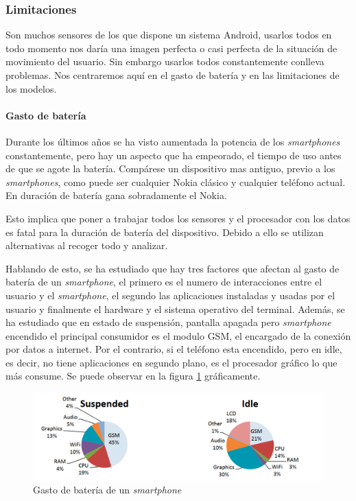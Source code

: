 \documentclass[12pt]{article}
\numberwithin{equation}{section}
\begin{document}
{\subsubsection{Limitaciones}

Son muchos sensores de los que dispone un sistema Android, usarlos todos en todo momento nos daría una imagen perfecta o casi perfecta de la situación de movimiento del usuario. Sin embargo usarlos todos constantemente conlleva problemas. Nos centraremos aquí en el gasto de batería y en las limitaciones de los modelos.

\paragraph{Gasto de batería}
Durante los últimos años se ha visto aumentada la potencia de los \textit{smartphones} constantemente, pero hay un aspecto que ha empeorado, el tiempo de uso antes de que se agote la batería. Compárese un dispositivo mas antiguo, previo a los \textit{smartphones}, como puede ser cualquier Nokia clásico y cualquier teléfono actual. En duración de batería gana sobradamente el Nokia. 

Esto implica que poner a trabajar todos los sensores y el procesador con los datos es fatal para la duración de batería del dispositivo. Debido a ello se utilizan alternativas al recoger todo y analizar. 

Hablando de esto, se ha estudiado que hay tres factores que afectan al gasto de batería de un \textit{smartphone}, el primero es el numero de interacciones entre el usuario y el \textit{smartphone}, el segundo las aplicaciones instaladas y usadas por el usuario y finalmente el hardware y el sistema operativo del terminal\cite{Falaki:2010:DSU:1814433.1814453}. Además, se ha estudiado que en estado de suspensión, pantalla apagada pero \textit{smartphone} encendido el principal consumidor es el modulo GSM, el encargado de la conexión por datos a internet. Por el contrario, si el teléfono esta encendido, pero en idle, es decir, no tiene aplicaciones en segundo plano, es el procesador gráfico lo que más consume\cite{Carroll:2010:APC:1855840.1855861}. Se puede observar en la figura \ref{fig:consumo} gráficamente.
\begin{figure}[h]
    \centering
    \includegraphics[width=1\textwidth]{batterylife.png}
    \caption{Gasto de batería de un \textit{smartphone}\cite{Carroll:2010:APC:1855840.1855861}}
    \label{fig:consumo}
\end{figure}

}
\end{document}
